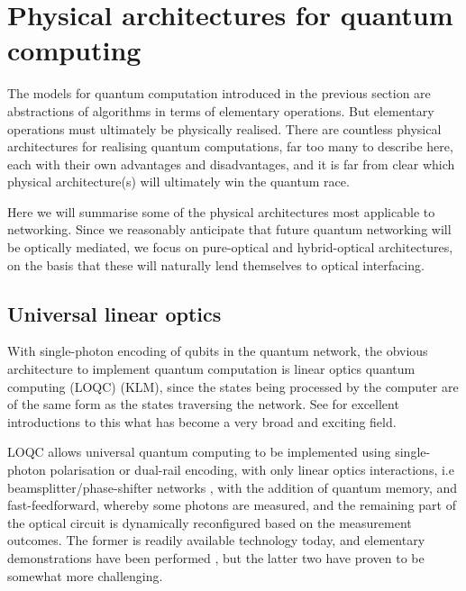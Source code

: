 %
%

\section{Physical architectures for quantum computing} \label{sec:archs_QC} 

The models for quantum computation introduced in the previous section are abstractions of algorithms in terms of elementary operations. But elementary operations must ultimately be physically realised. There are countless physical architectures for realising quantum computations, far too many to describe here, each with their own advantages and disadvantages, and it is far from clear which physical architecture(s) will ultimately win the quantum race.

Here we will summarise some of the physical architectures most applicable to networking. Since we reasonably anticipate that future quantum networking will be optically mediated, we focus on pure-optical and hybrid-optical architectures, on the basis that these will naturally lend themselves to optical interfacing.

%
%

\subsection{Universal linear optics} \label{sec:KLM_univ} 

With single-photon encoding of qubits in the quantum network, the obvious architecture to implement quantum computation is linear optics quantum computing (LOQC) \cite{bib:KLM01} (KLM), since the states being processed by the computer are of the same form as the states traversing the network. See \cite{bib:Kok05, bib:KokLovettBook} for excellent introductions to this what has become a very broad and exciting field.

LOQC allows universal quantum computing to be implemented using single-photon polarisation or dual-rail encoding, with only linear optics interactions, i.e beamsplitter/phase-shifter networks \cite{bib:Reck94}, with the addition of quantum memory, and fast-feedforward, whereby some photons are measured, and the remaining part of the optical circuit is dynamically reconfigured based on the measurement outcomes. The former is readily available technology today, and elementary demonstrations have been performed \cite{bib:OBrien03, bib:UniversalLOOBrien}, but the latter two have proven to be somewhat more challenging.

